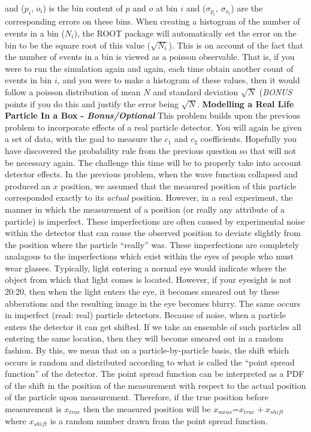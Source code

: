 \documentclass[12pt]{article}
\begin{document}
and ($p_{i}$, $o_{i}$) is the bin content of $p$ and $o$ at bin $i$ and ($\sigma_{p_{i}}$, $\sigma_{o_{i}}$) are the corresponding errors on these bins.  When creating a histogram of the number of events in a bin ($N_{i}$), the ROOT package will automatically set the error on the bin to be the square root of this value ($\sqrt{N_{i}}$).  This is on account of the fact that the number of events in a bin is viewed as a poisson observable.  That is, if you were to run the simulation again and again, each time obtain another count of events in bin $i$, and you were to make a histogram of these values, then it would follow a poisson distribution of mean $N$ and standard deviation $\sqrt{N}$ (\textit{BONUS} points if you do this and justify the error being $\sqrt{N}$. 
\newline
\newline
\textbf{Modelling a \textbf{Real Life} Particle In a Box - \textit{Bonus/Optional}} 
\newline
This problem builds upon the previous problem to incorporate effects of a real particle detector.  You will again be given a set of data, with the goal to measure the $c_1$ and $c_2$ coefficients.  Hopefully you have discovered the probability rule from the previous question so that will not be necessary again.  The challenge this time will be to properly take into account detector effects.
\newline
\newline
In the previous problem, when the wave function collapsed and produced an $x$ position, we assumed that the measured position of this particle corresponded exactly to its \textit{actual} position.  However, in a real experiment, the manner in which the measurement of a position (or really any attribute of a particle) is imperfect.  These imperfections are often caused by experimental noise within the detector that can cause the observed position to deviate slightly from the position where the particle ``really'' was.  These imperfections are completely analagous to the imperfections which exist within the eyes of people who must wear glasses.  Typically, light entering a normal eye would indicate where the object from which that light comes is located.  However, if your eyesight is not 20:20, then when the light enters the eye, it becomes smeared out by these abberations and the resulting image in the eye becomes blurry.  The same occurs in imperfect (read: real) particle detectors.  Because of noise, when a particle enters the detector it can get shifted.  If we take an ensemble of such particles all entering the same location, then they will become smeared out in a random fashion.  By this, we mean that on a particle-by-particle basis, the shift which occurs is random and distributed according to what is called the ``point spread function'' of the detector.    The point spread function can be interpreted as a PDF of the shift in the position of the measurement with respect to the actual position of the particle upon measurement.  Therefore, if the true position before measurement is $x_{true}$ then the measured position will be $x_{meas}$=$x_{true}+x_{shift}$ where $x_{shift}$ is a random number drawn from the point spread function.
\end{document}
